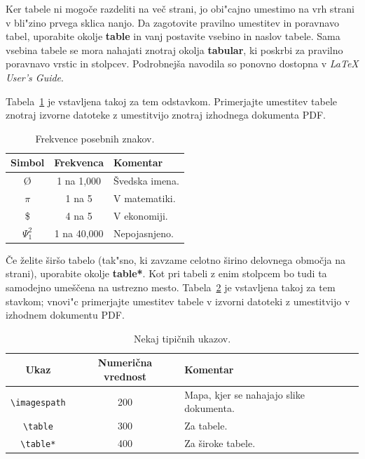 \documentclass[sigconf,nonacm]{acmart}
\begin{document}
Ker tabele ni mogoče razdeliti na več strani, jo obi"cajno umestimo na vrh
strani v bli"zino prvega sklica nanjo.  Da zagotovite pravilno umestitev in
poravnavo tabel, uporabite okolje \textbf{table} in vanj postavite vsebino in
naslov tabele.  Sama vsebina tabele se mora nahajati znotraj okolja
\textbf{tabular}, ki poskrbi za pravilno poravnavo vrstic in stolpcev.
Podrobnejša navodila so ponovno dostopna v \emph{\LaTeX{} User's Guide}.
    
Tabela~\ref{tab:table1} je vstavljena takoj za tem odstavkom.  Primerjajte
umestitev tabele znotraj izvorne datoteke z umestitvijo znotraj izhodnega
dokumenta PDF\@.

\begin{table}
    \centering
    \caption{Frekvence posebnih znakov.}
    \label{tab:table1}
    \begin{tabular}{ccl}
        \toprule
        Simbol&Frekvenca&Komentar\\
        \midrule
        \O & 1 na 1,000& Švedska imena.\\
        $\pi$ & 1 na 5& V matematiki.\\
        \$ & 4 na 5 & V ekonomiji.\\
        $\Psi^2_1$ & 1 na 40,000& Nepojasnjeno. \\
        \bottomrule
    \end{tabular}
\end{table}

Če želite širšo tabelo (tak"sno, ki zavzame celotno širino delovnega območja
na strani), uporabite okolje \textbf{table*}.  Kot pri tabeli z enim stolpcem
bo tudi ta samodejno umeščena na ustrezno mesto.  Tabela~\ref{tab:table2} je
vstavljena takoj za tem stavkom; vnovi"c primerjajte umestitev tabele v
izvorni datoteki z umestitvijo v izhodnem dokumentu PDF\@.

\begin{table}
    \centering
    \caption{Nekaj tipičnih ukazov.}
    \label{tab:table2}
    \begin{tabular}{ccl}
        \toprule
        Ukaz&Numerična vrednost&Komentar\\
        \midrule
        \texttt{\textbackslash{}imagespath} & 200 & Mapa, kjer se nahajajo slike dokumenta. \\
        \texttt{\textbackslash{}table} & 300 & Za tabele.\\
        \texttt{\textbackslash{}table*} & 400& Za široke tabele.\\
        \bottomrule
    \end{tabular}
\end{table}
\end{document}

